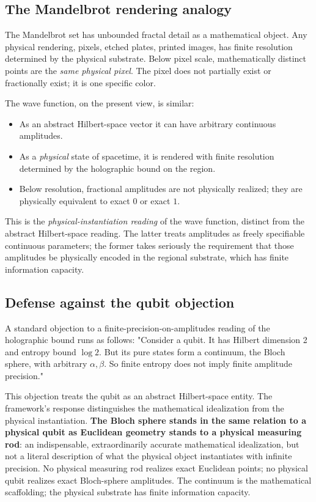 \documentclass[11pt,a4paper]{article}
\begin{document}
\subsection{The Mandelbrot rendering analogy}

The Mandelbrot set has unbounded fractal detail as a mathematical object. Any physical rendering, pixels, etched plates, printed images, has finite resolution determined by the physical substrate. Below pixel scale, mathematically distinct points are the \emph{same physical pixel}. The pixel does not partially exist or fractionally exist; it is one specific color.

The wave function, on the present view, is similar:
\begin{itemize}
  \item As an abstract Hilbert-space vector it can have arbitrary continuous amplitudes.
  \item As a \emph{physical} state of spacetime, it is rendered with finite resolution determined by the holographic bound on the region.
  \item Below resolution, fractional amplitudes are not physically realized; they are physically equivalent to exact $0$ or exact $1$.
\end{itemize}

This is the \emph{physical-instantiation reading} of the wave function, distinct from the abstract Hilbert-space reading. The latter treats amplitudes as freely specifiable continuous parameters; the former takes seriously the requirement that those amplitudes be physically encoded in the regional substrate, which has finite information capacity.

\subsection{Defense against the qubit objection}

A standard objection to a finite-precision-on-amplitudes reading of the holographic bound runs as follows: "Consider a qubit. It has Hilbert dimension 2 and entropy bound $\log 2$. But its pure states form a continuum, the Bloch sphere, with arbitrary $\alpha, \beta$. So finite entropy does not imply finite amplitude precision."

This objection treats the qubit as an abstract Hilbert-space entity. The framework's response distinguishes the mathematical idealization from the physical instantiation. \textbf{The Bloch sphere stands in the same relation to a physical qubit as Euclidean geometry stands to a physical measuring rod}: an indispensable, extraordinarily accurate mathematical idealization, but not a literal description of what the physical object instantiates with infinite precision. No physical measuring rod realizes exact Euclidean points; no physical qubit realizes exact Bloch-sphere amplitudes. The continuum is the mathematical scaffolding; the physical substrate has finite information capacity.
\end{document}
